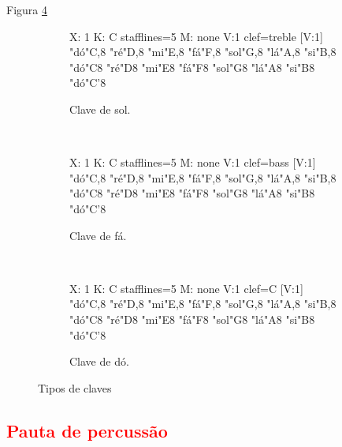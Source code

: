 Figura \ref{fig:allclaves}
\begin{figure}[h]
    \centering
\begin{subfigure}[b]{\textwidth}
\caption{Clave de sol.}
\begin{abc}[name=abc-clavesol]
%
X: 1 %
K: C stafflines=5 %
M: none %
V:1 clef=treble %
%
[V:1] "dó"C,8 "ré"D,8 "mi"E,8 "fá"F,8  "sol"G,8 "lá"A,8 "si"B,8 "dó"C8 "ré"D8 "mi"E8 "fá"F8  "sol"G8 "lá"A8 "si"B8 "dó"C'8 
\end{abc}
\label{fig:abc-clavesol}
\end{subfigure}
~ %
\begin{subfigure}[b]{\textwidth}
\caption{Clave de fá.}
\begin{abc}[name=abc-clavefa]
%
X: 1 %
K: C stafflines=5 %
M: none %
V:1 clef=bass %
%
[V:1] "dó"C,8 "ré"D,8 "mi"E,8 "fá"F,8  "sol"G,8 "lá"A,8 "si"B,8 "dó"C8 "ré"D8 "mi"E8 "fá"F8  "sol"G8 "lá"A8 "si"B8 "dó"C'8 
\end{abc}
\label{fig:abc-clavefa}
\end{subfigure}
~ %
\begin{subfigure}[b]{\textwidth}
\caption{Clave de dó.}
\begin{abc}[name=abc-clavedo]
%
X: 1 %
K: C stafflines=5 %
M: none %
V:1 clef=C %
%
[V:1] "dó"C,8 "ré"D,8 "mi"E,8 "fá"F,8  "sol"G,8 "lá"A,8 "si"B,8 "dó"C8 "ré"D8 "mi"E8 "fá"F8  "sol"G8 "lá"A8 "si"B8 "dó"C'8 
\end{abc}
\label{fig:abc-clavedo}
\end{subfigure}
    \caption{Tipos de claves}\label{fig:allclaves}
\end{figure}

\subsection{\textcolor{red}{Pauta de percussão}}

